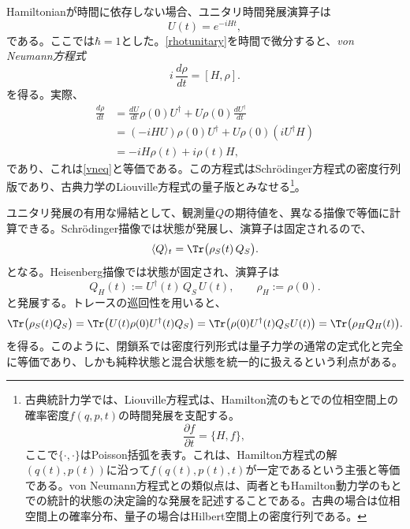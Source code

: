 \documentclass[a4paper,11pt,oneside]{article}
\theoremstyle{definition}
\numberwithin{equation}{section}
\begin{document}
Hamiltonianが時間に依存しない場合、ユニタリ時間発展演算子は
\begin{equation}
U(t)=e^{-iHt} ,
\end{equation}
である。ここでは$\hbar=1$とした。\eqref{rhotunitary}を時間で微分すると、\textit{von Neumann方程式}
\begin{equation}\label{vneq}
i\,\frac{d\rho}{dt} = [H,\rho] .
\end{equation}
を得る。実際、
\begin{align}
\frac{d\rho}{dt}
&=
\frac{dU}{dt}\rho(0)U^\dagger
+
U\rho(0)\frac{dU^\dagger}{dt}
\nonumber\\
&=
(-iHU)\rho(0)U^\dagger
+
U\rho(0)(iU^\dagger H)
\nonumber\\
&=
-iH\rho(t)+i\rho(t)H ,
\end{align}
であり、これは\eqref{vneq}と等価である。この方程式はSchr\"odinger方程式の密度行列版であり、古典力学のLiouville方程式の量子版とみなせる\footnote{古典統計力学では、Liouville方程式は、Hamilton流のもとでの位相空間上の確率密度$f(q,p,t)$の時間発展を支配する。
\begin{equation}
\frac{\partial f}{\partial t} = \{H,f\} ,
\end{equation}
ここで$\{\cdot,\cdot\}$はPoisson括弧を表す。これは、Hamilton方程式の解$ (q(t),p(t))$に沿って$ f(q(t),p(t),t)$が一定であるという主張と等価である。von Neumann方程式との類似点は、両者ともHamilton動力学のもとでの統計的状態の決定論的な発展を記述することである。古典の場合は位相空間上の確率分布、量子の場合はHilbert空間上の密度行列である。}。



ユニタリ発展の有用な帰結として、観測量$Q$の期待値を、異なる描像で等価に計算できる。Schr\"odinger描像では状態が発展し、演算子は固定されるので、
\begin{equation}
\langle Q\rangle_t = \Tr\bigl(\rho_S(t)\,Q_S\bigr) .
\end{equation}
となる。Heisenberg描像では状態が固定され、演算子は
\begin{equation}
Q_H(t) := U^\dagger(t)\,Q_S\,U(t) ,
\qquad
\rho_H := \rho(0) .
\end{equation}
と発展する。トレースの巡回性を用いると、
\begin{equation}
\Tr\bigl(\rho_S(t)Q_S\bigr)
=
\Tr\bigl(U(t)\rho(0)U^\dagger(t)Q_S\bigr)
=
\Tr\bigl(\rho(0)U^\dagger(t)Q_SU(t)\bigr)
=
\Tr\bigl(\rho_H Q_H(t)\bigr) .
\end{equation}
を得る。このように、閉鎖系では密度行列形式は量子力学の通常の定式化と完全に等価であり、しかも純粋状態と混合状態を統一的に扱えるという利点がある。
\end{document}
